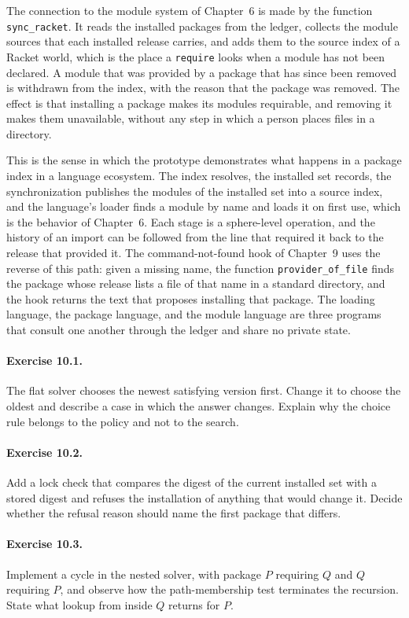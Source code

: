 The connection to the module system of Chapter~6 is made by the function \texttt{sync\_racket}. It reads the installed packages from the ledger, collects the module sources that each installed release carries, and adds them to the source index of a Racket world, which is the place a \texttt{require} looks when a module has not been declared. A module that was provided by a package that has since been removed is withdrawn from the index, with the reason that the package was removed. The effect is that installing a package makes its modules requirable, and removing it makes them unavailable, without any step in which a person places files in a directory.


This is the sense in which the prototype demonstrates what happens in a package index in a language ecosystem. The index resolves, the installed set records, the synchronization publishes the modules of the installed set into a source index, and the language's loader finds a module by name and loads it on first use, which is the behavior of Chapter~6. Each stage is a sphere-level operation, and the history of an import can be followed from the line that required it back to the release that provided it. The command-not-found hook of Chapter~9 uses the reverse of this path: given a missing name, the function \texttt{provider\_of\_file} finds the package whose release lists a file of that name in a standard directory, and the hook returns the text that proposes installing that package. The loading language, the package language, and the module language are three programs that consult one another through the ledger and share no private state.

\paragraph{Exercise 10.1.} The flat solver chooses the newest satisfying version first. Change it to choose the oldest and describe a case in which the answer changes. Explain why the choice rule belongs to the policy and not to the search.

\paragraph{Exercise 10.2.} Add a lock check that compares the digest of the current installed set with a stored digest and refuses the installation of anything that would change it. Decide whether the refusal reason should name the first package that differs.

\paragraph{Exercise 10.3.} Implement a cycle in the nested solver, with package $P$ requiring $Q$ and $Q$ requiring $P$, and observe how the path-membership test terminates the recursion. State what lookup from inside $Q$ returns for $P$.
